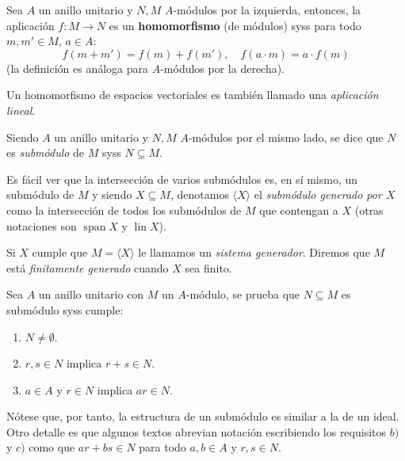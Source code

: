 \documentclass[11pt,oneside]{book}
\begin{document}
\begin{mydef}
Sea $A$ un anillo unitario y $N,M$ $A$-módulos por la izquierda, entonces, la aplicación $f:M\rightarrow N$ es un \textbf{homomorfismo} (de módulos) syss para todo $m,m'\in M$, $a\in A$:
$$f(m+m')=f(m)+f(m'),\quad f(a\cdot m)=a\cdot f(m)$$
(la definición es análoga para $A$-módulos por la derecha).

Un homomorfismo de espacios vectoriales es también llamado una \textit{aplicación lineal}.
\end{mydef}
\begin{mydef}[Submódulo]
Siendo $A$ un anillo unitario y $N,M$ $A$-módulos por el mismo lado, se dice que $N$ es \textit{submódulo} de $M$ syss $N\subseteq M$.

Es fácil ver que la intersección de varios submódulos es, en sí mismo, un submódulo de $M$ y siendo $X\subseteq M$, denotamos $\langle X\rangle$  el \textit{submódulo generado por $X$} como la intersección de todos los submódulos de $M$ que contengan a $X$ (otras notaciones son $\operatorname{span}X$ y $\operatorname{lin}X$).

Si $X$ cumple que $M=\langle X\rangle$ le llamamos un \textit{sistema generador}. Diremos que $M$ está \textit{finitamente generado} cuando $X$ sea finito.
\end{mydef}
\begin{thm}
Sea $A$ un anillo unitario con $M$ un $A$-módulo, se prueba que $N\subseteq M$ es submódulo syss cumple:
\begin{enumerate}[$a)$]
	\item $N\neq\emptyset$.
	\item $r,s\in N$ implica $r+s\in N$.
	\item $a\in A$ y $r\in N$ implica $ar\in N$.
\end{enumerate}
\end{thm}
Nótese que, por tanto, la estructura de un submódulo es similar a la de un ideal. Otro detalle es que algunos textos abrevian notación escribiendo los requisitos $b)$ y $c)$ como que $ar+bs\in N$ para todo $a,b\in A$ y $r,s\in N$.
\end{document}
